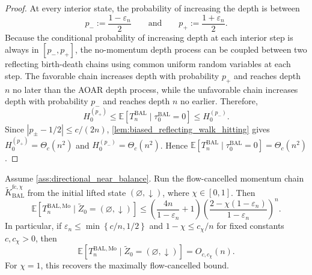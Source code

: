 \documentclass{article}
\numberwithin{theorem}{section}
\numberwithin{proposition}{section}
\numberwithin{corollary}{section}
\numberwithin{lemma}{section}
\numberwithin{conjecture}{section}
\numberwithin{remark}{section}
\numberwithin{definition}{section}
\numberwithin{assumption}{section}
\numberwithin{example}{section}
\newcommand{\bbE}{\mathbb{E}}
\newcommand{\lbra}[1]{\left[#1\right]}
\newcommand{\mbra}[1]{\left\{#1\right\}}
\newcommand{\sbra}[1]{\left(#1\right)}
\begin{document}
\begin{proof}
At every interior state, the probability of increasing the depth is between
\begin{equation*}
    p_-:=\frac{1-\varepsilon_n}{2}\qquad\text{and}\qquad p_+:=\frac{1+\varepsilon_n}{2}.
\end{equation*}
Because the conditional probability of increasing depth at each interior step is always in \([p_-,p_+]\), the no-momentum depth process can be coupled between two reflecting birth-death chains using common uniform random variables at each step. The favorable chain increases depth with probability \(p_+\) and reaches depth \(n\) no later than the AOAR depth process, while the unfavorable chain increases depth with probability \(p_-\) and reaches depth \(n\) no earlier. Therefore,
\begin{equation*}
    H_0^{(p_+)}
    \le
    \bbE\lbra{T_n^{\mathrm{BAL}}\mid \tau_0^{\mathrm{BAL}}=0}
    \le
    H_0^{(p_-)}.
\end{equation*}
Since $|p_\pm-1/2|\le c/(2n)$, \cref{lem:biased_reflecting_walk_hitting} gives $H_0^{(p_+)}=\Theta_c(n^2)$ and $H_0^{(p_-)}=\Theta_c(n^2)$. Hence $\bbE[T_n^{\mathrm{BAL}}\mid \tau_0^{\mathrm{BAL}}=0]=\Theta_c(n^2)$.
\end{proof}

\begin{theorem}
\label{thm:robust_flow_cancelled_hitting}
Assume \cref{ass:directional_near_balance}. Run the flow-cancelled momentum
chain $\widetilde K_{\mathrm{BAL}}^{\mathrm{fc},\chi}$ from the initial
lifted state $(\varnothing,\downarrow)$, where $\chi\in[0,1]$. Then
\begin{equation*}
    \bbE\lbra{
        T_n^{\mathrm{BAL,Mo}}
        \mid
        \widetilde Z_0=(\varnothing,\downarrow)
    }
    \le
    \sbra{
        \frac{4n}{1-\varepsilon_n}+1
    }
    \sbra{
        \frac{2-\chi(1-\varepsilon_n)}
             {1-\varepsilon_n}
    }^n .
\end{equation*}
In particular, if $\varepsilon_n\le \min\mbra{c/n,1/2}$ and
$1-\chi\le c_\chi/n$ for fixed constants $c,c_\chi>0$, then
\begin{equation*}
    \bbE\lbra{
        T_n^{\mathrm{BAL,Mo}}
        \mid
        \widetilde Z_0=(\varnothing,\downarrow)
    }
    =
    O_{c,c_\chi}(n).
\end{equation*}
For $\chi=1$, this recovers the maximally flow-cancelled bound.
\end{theorem}
\end{document}

